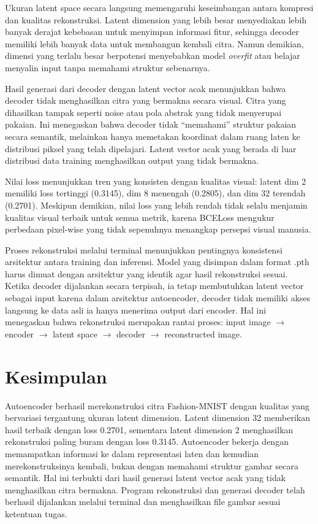 \documentclass[12pt,a4paper]{article}
\begin{document}
Ukuran latent space secara langsung memengaruhi keseimbangan antara kompresi dan kualitas rekonstruksi. Latent dimension yang lebih besar menyediakan lebih banyak derajat kebebasan untuk menyimpan informasi fitur, sehingga decoder memiliki lebih banyak data untuk membangun kembali citra. Namun demikian, dimensi yang terlalu besar berpotensi menyebabkan model \textit{overfit} atau belajar menyalin input tanpa memahami struktur sebenarnya.

Hasil generasi dari decoder dengan latent vector acak menunjukkan bahwa decoder tidak menghasilkan citra yang bermakna secara visual. Citra yang dihasilkan tampak seperti noise atau pola abstrak yang tidak menyerupai pakaian. Ini menegaskan bahwa decoder tidak ``memahami'' struktur pakaian secara semantik, melainkan hanya memetakan koordinat dalam ruang laten ke distribusi piksel yang telah dipelajari. Latent vector acak yang berada di luar distribusi data training menghasilkan output yang tidak bermakna.

Nilai loss menunjukkan tren yang konsisten dengan kualitas visual: latent dim 2 memiliki loss tertinggi (0.3145), dim 8 menengah (0.2805), dan dim 32 terendah (0.2701). Meskipun demikian, nilai loss yang lebih rendah tidak selalu menjamin kualitas visual terbaik untuk semua metrik, karena BCELoss mengukur perbedaan pixel-wise yang tidak sepenuhnya menangkap persepsi visual manusia.

Proses rekonstruksi melalui terminal menunjukkan pentingnya konsistensi arsitektur antara training dan inferensi. Model yang disimpan dalam format .pth harus dimuat dengan arsitektur yang identik agar hasil rekonstruksi sesuai. Ketika decoder dijalankan secara terpisah, ia tetap membutuhkan latent vector sebagai input karena dalam arsitektur autoencoder, decoder tidak memiliki akses langsung ke data asli \textemdash{} ia hanya menerima output dari encoder. Hal ini menegaskan bahwa rekonstruksi merupakan rantai proses: input image $\rightarrow$ encoder $\rightarrow$ latent space $\rightarrow$ decoder $\rightarrow$ reconstructed image.

\section{Kesimpulan}
Autoencoder berhasil merekonstruksi citra Fashion-MNIST dengan kualitas yang bervariasi tergantung ukuran latent dimension. Latent dimension 32 memberikan hasil terbaik dengan loss 0.2701, sementara latent dimension 2 menghasilkan rekonstruksi paling buram dengan loss 0.3145. Autoencoder bekerja dengan memampatkan informasi ke dalam representasi laten dan kemudian merekonstruksinya kembali, bukan dengan memahami struktur gambar secara semantik. Hal ini terbukti dari hasil generasi latent vector acak yang tidak menghasilkan citra bermakna. Program rekonstruksi dan generasi decoder telah berhasil dijalankan melalui terminal dan menghasilkan file gambar sesuai ketentuan tugas.
\end{document}
